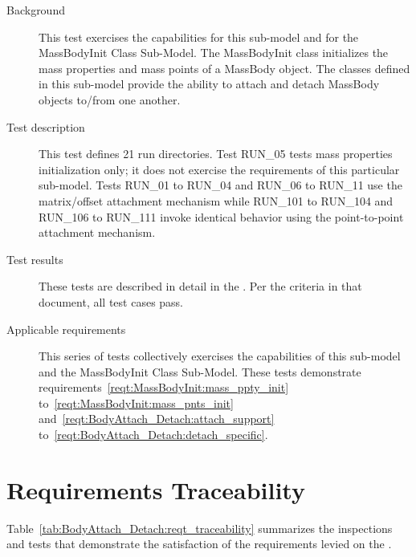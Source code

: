 \label{test:BodyAttach_Detach:attach_detach}
\begin{description}
\item[Background]
This test exercises the capabilities for this sub-model and
for the  MassBodyInit Class Sub-Model.
The MassBodyInit class initializes the mass properties and mass points
of a MassBody object. The classes defined in this sub-model
provide the ability to attach and detach MassBody objects to/from one another.
\item[Test description]
This test defines 21 run directories.
Test RUN\_05 tests mass properties initialization only;
it does not exercise the requirements of this particular sub-model.
Tests RUN\_01 to RUN\_04 and RUN\_06 to RUN\_11 use the matrix/offset
attachment mechanism while RUN\_101 to RUN\_104 and RUN\_106 to RUN\_111 invoke
identical behavior using the point-to-point attachment mechanism.

\item[Test results]
These tests are described in detail in the
.
Per the criteria in that document,
all test cases pass.

\item[Applicable requirements]
This series of tests collectively exercises the capabilities of this sub-model
and the MassBodyInit Class Sub-Model. These tests demonstrate
requirements~\ref{reqt:MassBodyInit:mass_ppty_init}
to~\ref{reqt:MassBodyInit:mass_pnts_init}
and~\ref{reqt:BodyAttach_Detach:attach_support}
to~\ref{reqt:BodyAttach_Detach:detach_specific}.
\end{description}

\section{Requirements Traceability}
Table~\ref{tab:BodyAttach_Detach:reqt_traceability}
summarizes the inspections and tests that demonstrate the satisfaction of the
requirements levied on the \partxname.

